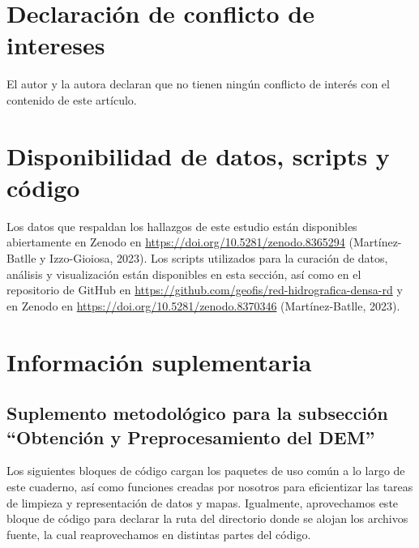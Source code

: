 \documentclass[spanish]{article}
\begin{document}
\hypertarget{declaraciuxf3n-de-conflicto-de-intereses}{%
\section*{Declaración de conflicto de
intereses}\label{declaraciuxf3n-de-conflicto-de-intereses}}

El autor y la autora declaran que no tienen ningún conflicto de interés
con el contenido de este artículo.

\hypertarget{disponibilidad-de-datos-scripts-y-cuxf3digo}{%
\section*{Disponibilidad de datos, scripts y
código}\label{disponibilidad-de-datos-scripts-y-cuxf3digo}}

Los datos que respaldan los hallazgos de este estudio están disponibles
abiertamente en Zenodo en \url{https://doi.org/10.5281/zenodo.8365294}
(Martínez-Batlle y Izzo-Gioiosa, 2023). Los scripts utilizados para la
curación de datos, análisis y visualización están disponibles en esta
sección, así como en el repositorio de GitHub en
\url{https://github.com/geofis/red-hidrografica-densa-rd} y en Zenodo en
\url{https://doi.org/10.5281/zenodo.8370346} (Martínez-Batlle, 2023).

\newpage

\hypertarget{infosupl}{%
\section*{Información suplementaria}\label{infosupl}}

\beginsupplement

\hypertarget{suplemento-metodoluxf3gico-para-la-subsecciuxf3n-obtenciuxf3n-y-preprocesamiento-del-dem}{%
\subsection*{Suplemento metodológico para la subsección ``Obtención y
Preprocesamiento del
DEM''}\label{suplemento-metodoluxf3gico-para-la-subsecciuxf3n-obtenciuxf3n-y-preprocesamiento-del-dem}}

Los siguientes bloques de código cargan los paquetes de uso común a lo
largo de este cuaderno, así como funciones creadas por nosotros para
eficientizar las tareas de limpieza y representación de datos y mapas.
Igualmente, aprovechamos este bloque de código para declarar la ruta del
directorio donde se alojan los archivos fuente, la cual reaprovechamos
en distintas partes del código.
\end{document}
